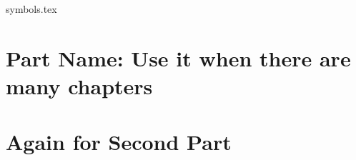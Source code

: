 %
%


{symbols.tex}

\mainmatter       %

\fancyhead{}   %
\fancyhead[LO]{\sl{\leftmark}}
\fancyhead[RE]{\sl{\rightmark}}
\fancyhead[LE,RO]{\thepage}




\part{Part Name: Use it when there are many chapters}


\part{Again for Second Part}






\appendix %

